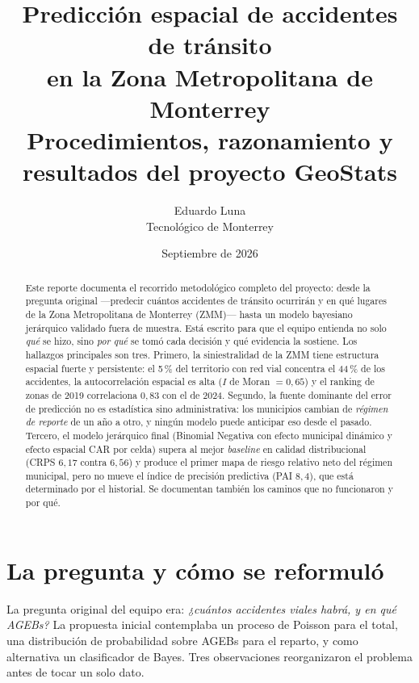 \documentclass[11pt,a4paper]{article}
\title{\textbf{Predicción espacial de accidentes de tránsito\\en la Zona Metropolitana de Monterrey}\\[6pt]
\large Procedimientos, razonamiento y resultados del proyecto GeoStats}
\author{Eduardo Luna\\\small Tecnológico de Monterrey}
\date{Septiembre de 2026}
\begin{document}
\maketitle

\begin{abstract}
\noindent
Este reporte documenta el recorrido metodológico completo del proyecto: desde
la pregunta original —predecir cuántos accidentes de tránsito ocurrirán y en
qué lugares de la Zona Metropolitana de Monterrey (ZMM)— hasta un modelo
bayesiano jerárquico validado fuera de muestra. Está escrito para que el equipo
entienda no solo \emph{qué} se hizo, sino \emph{por qué} se tomó cada decisión
y qué evidencia la sostiene. Los hallazgos principales son tres. Primero, la
siniestralidad de la ZMM tiene estructura espacial fuerte y persistente: el
5\,\% del territorio con red vial concentra el 44\,\% de los accidentes, la
autocorrelación espacial es alta ($I$ de Moran $= 0{,}65$) y el ranking de
zonas de 2019 correlaciona $0{,}83$ con el de 2024. Segundo, la fuente
dominante del error de predicción no es estadística sino administrativa: los
municipios cambian de \emph{régimen de reporte} de un año a otro, y ningún
modelo puede anticipar eso desde el pasado. Tercero, el modelo jerárquico
final (Binomial Negativa con efecto municipal dinámico y efecto espacial CAR
por celda) supera al mejor \emph{baseline} en calidad distribucional
(CRPS $6{,}17$ contra $6{,}56$) y produce el primer mapa de riesgo relativo neto
del régimen municipal, pero no mueve el índice de precisión predictiva (PAI
$8{,}4$), que está determinado por el historial. Se documentan también los
caminos que no funcionaron y por qué.
\end{abstract}

\tableofcontents
\clearpage

\section{La pregunta y cómo se reformuló}

La pregunta original del equipo era: \emph{¿cuántos accidentes viales habrá, y
en qué AGEBs?} La propuesta inicial contemplaba un proceso de Poisson para el
total, una distribución de probabilidad sobre AGEBs para el reparto, y como
alternativa un clasificador de Bayes. Tres observaciones reorganizaron el
problema antes de tocar un solo dato.
\end{document}
